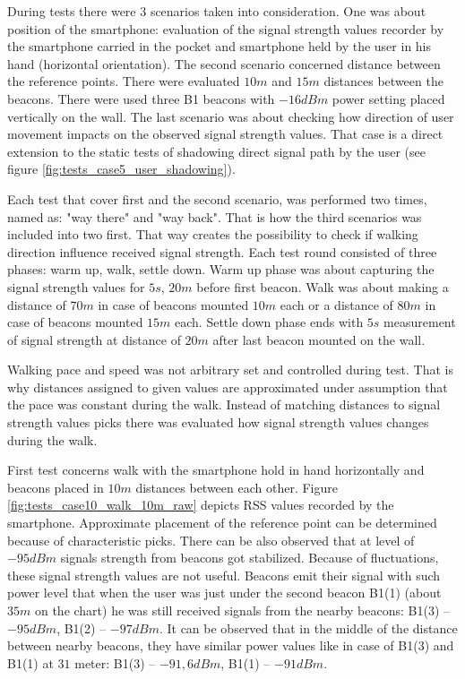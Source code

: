 \documentclass[../main.tex]{subfiles}
\begin{document}
During tests there were 3 scenarios taken into consideration. One was about position of the smartphone: evaluation of the signal strength values recorder by the smartphone carried in the pocket and smartphone held by the user in his hand (horizontal orientation). The second scenario concerned distance between the reference points. There were evaluated $10m$ and $15m$ distances between the beacons. There were used three B1 beacons with $-16dBm$ power setting placed vertically on the wall. The last scenario was about checking how direction of user movement impacts on the observed signal strength values. That case is a direct extension to the static tests of shadowing direct signal path by the user (see figure \ref{fig:tests_case5_user_shadowing}).

Each test that cover first and the second scenario, was performed two times, named as: "way there" and "way back". That is how the third scenarios was included into two first. That way creates the possibility to check if walking direction influence received signal strength. Each test round consisted of three phases: warm up, walk, settle down. Warm up phase was about capturing the signal strength values for $5s$, $20m$ before first beacon. Walk was about making a distance of $70m$ in case of beacons mounted $10m$ each or a distance of $80m$ in case of beacons mounted $15m$ each. Settle down phase ends with $5s$ measurement of signal strength at distance of $20m$ after last beacon mounted on the wall.

Walking pace and speed was not arbitrary set and controlled during test. That is why distances assigned to given values are approximated under assumption that the pace was constant during the walk. Instead of matching distances to signal strength values picks there was evaluated how signal strength values changes during the walk.


First test concerns walk with the smartphone hold in hand horizontally and beacons placed in $10m$ distances between each other. Figure \ref{fig:tests_case10_walk_10m_raw} depicts RSS values recorded by the smartphone. Approximate placement of the reference point can be determined because of characteristic picks. There can be also observed that at level of $-95dBm$ signals strength from beacons got stabilized. Because of fluctuations, these signal strength values are not useful. Beacons emit their signal with such power level that when the user was just under the second beacon B1(1) (about $35m$ on the chart) he was still received signals from the nearby beacons: B1(3) -- $-95dBm$, B1(2) -- $-97dBm$. It can be observed that in the middle of the distance between nearby beacons, they have similar power values like in case of B1(3) and B1(1) at $31$ meter: B1(3) -- $-91,6dBm$, B1(1) -- $-91dBm$.
\end{document}
